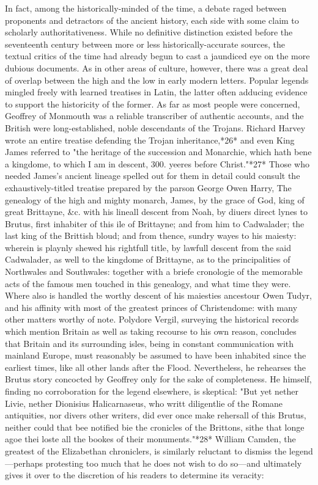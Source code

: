 	In fact, among the historically-minded of the time, a debate raged between proponents and detractors of the ancient history, each side with some claim to scholarly authoritativeness. While no definitive distinction existed before the seventeenth century between more or less historically-accurate sources, the textual critics of the time had already begun to cast a jaundiced eye on the more dubious documents. As in other areas of culture, however, there was a great deal of overlap between the high and the low in early modern letters. Popular legends mingled freely with learned treatises in Latin, the latter often adducing evidence to support the historicity of the former. As far as most people were concerned, Geoffrey of Monmouth was a reliable transcriber of authentic accounts, and the British were long-established, noble descendants of the Trojans. Richard Harvey wrote an entire treatise defending the Trojan inheritance,*26* and even King James referred to "the heritage of the succession and Monarchie, which hath bene a kingdome, to which I am in descent, 300. yeeres before Christ."*27* Those who needed James's ancient lineage spelled out for them in detail could consult the exhaustively-titled treatise prepared by the parson George Owen Harry, The genealogy of the high and mighty monarch, James, by the grace of God, king of great Brittayne, \&c. with his lineall descent from Noah, by diuers direct lynes to Brutus, first inhabiter of this ile of Brittayne; and from him to Cadwalader; the last king of the Brittish bloud; and from thence, sundry wayes to his maiesty: wherein is playnly shewed his rightfull title, by lawfull descent from the said Cadwalader, as well to the kingdome of Brittayne, as to the principalities of Northwales and Southwales: together with a briefe cronologie of the memorable acts of the famous men touched in this genealogy, and what time they were. Where also is handled the worthy descent of his maiesties ancestour Owen Tudyr, and his affinity with most of the greatest princes of Christendome: with many other matters worthy of note. Polydore Vergil, surveying the historical records which mention Britain as well as taking recourse to his own reason, concludes that Britain and its surrounding isles, being in constant communication with mainland Europe, must reasonably be assumed to have been inhabited since the earliest times, like all other lands after the Flood. Nevertheless, he rehearses the Brutus story concocted by Geoffrey only for the sake of completeness. He himself, finding no corroboration for the legend elsewhere, is skeptical: "But yet nether Livie, nether Dionisius Halicarnaseus, who writt diligentlie of the Romane antiquities, nor divers other writers, did ever once make rehersall of this Brutus, neither could that bee notified bie the cronicles of the Brittons, sithe that longe agoe thei loste all the bookes of their monuments."*28* William Camden, the greatest of the Elizabethan chroniclers, is similarly reluctant to dismiss the legend—perhaps protesting too much that he does not wish to do so—and ultimately gives it over to the discretion of his readers to determine its veracity:
